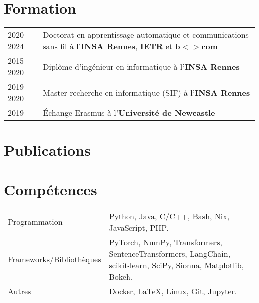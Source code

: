 \documentclass[a4paper,12pt]{article}
\begin{document}
\section{Formation}
\begin{tabularx}{\linewidth}{@{}l X@{}}	
2020 - 2024 & Doctorat en apprentissage automatique et communications sans fil à l'\textbf{INSA Rennes}, \textbf{IETR} et \textbf{b$<>$com} \\

2015 - 2020 & Diplôme d'ingénieur en informatique à l'\textbf{INSA Rennes}\\

2019 - 2020 & Master recherche en informatique (SIF) à l'\textbf{INSA Rennes}\\

2019 & Échange Erasmus à l'\textbf{Université de Newcastle}\\
\end{tabularx}

\section{Publications}
\begin{refsection}
\nocite{*}
\printbibliography[heading=none]
\end{refsection}

\section{Compétences}
\begin{tabularx}{\linewidth}{@{}l X@{}}
Programmation &  \normalsize{Python, Java, C/C++, Bash, Nix, JavaScript, PHP.}\\
Frameworks/Bibliothèques &  \normalsize{PyTorch, NumPy, Transformers, SentenceTransformers, LangChain, scikit-learn, SciPy, Sionna, Matplotlib, Bokeh.}\\  
Autres &  \normalsize{Docker, \LaTeX, Linux, Git, Jupyter.}
\end{tabularx}

\vfill
{}
\end{document}
